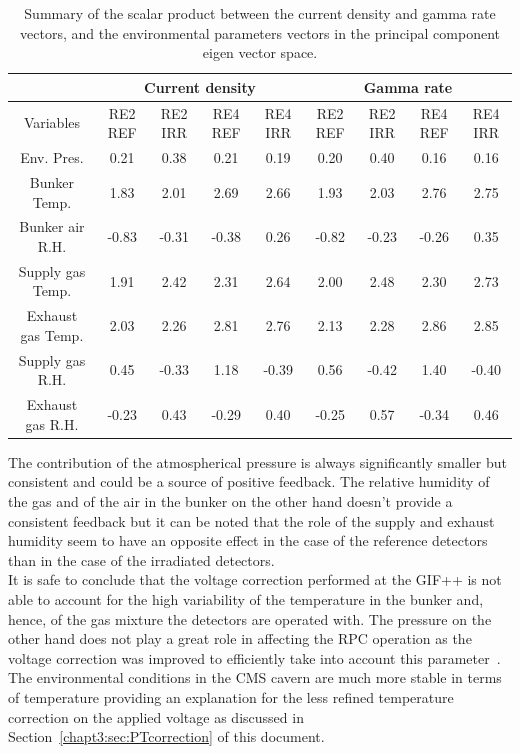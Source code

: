 	\begin{table}[H]
		\centering
		\scriptsize
		\begin{tabular}{|*{9}{c|}}
			\cline{2-9}
			\multicolumn{1}{c|}{} & \multicolumn{4}{c|}{Current density}  & \multicolumn{4}{c|}{Gamma rate}      \\
			\hline
			Variables             & RE2 REF & RE2 IRR & RE4 REF & RE4 IRR & RE2 REF & RE2 IRR & RE4 REF & RE4 IRR\\
			\hline
			Env. Pres.            &  0.21   &  0.38   &  0.21   &  0.19   &  0.20   &  0.40   &  0.16   &  0.16  \\
			\hline
			Bunker Temp.          &  1.83   &  2.01   &  2.69   &  2.66   &  1.93   &  2.03   &  2.76   &  2.75  \\
			\hline
			Bunker air R.H.       & -0.83   & -0.31   & -0.38   &  0.26   & -0.82   & -0.23   & -0.26   &  0.35  \\
			\hline
			Supply gas Temp.      &  1.91   &  2.42   &  2.31   &  2.64   &  2.00   &  2.48   &  2.30   &  2.73  \\
			\hline
			Exhaust gas Temp.     &  2.03   &  2.26   &  2.81   &  2.76   &  2.13   &  2.28   &  2.86   &  2.85  \\
			\hline
			Supply gas R.H.       &  0.45   & -0.33   &  1.18   & -0.39   &  0.56   & -0.42   &  1.40   & -0.40  \\
			\hline
			Exhaust gas R.H.      & -0.23   &  0.43   & -0.29   &  0.40   & -0.25   &  0.57   & -0.34   &  0.46  \\
			\hline
		\end{tabular}
		\caption{\label{tab:Scalar-FullData} Summary of the scalar product between the current density and gamma rate vectors, and the environmental parameters vectors in the principal component eigen vector space.}
	\end{table}

\normalsize
	
	The contribution of the atmospherical pressure is always significantly smaller but consistent and could be a source of positive feedback. The relative humidity of the gas and of the air in the bunker on the other hand doesn't provide a consistent feedback but it can be noted that the role of the supply and exhaust humidity seem to have an opposite effect in the case of the reference detectors than in the case of the irradiated detectors.\\
	It is safe to conclude that the voltage correction performed at the GIF++ is not able to account for the high variability of the temperature in the bunker and, hence, of the gas mixture the detectors are operated with. The pressure on the other hand does not play a great role in affecting the RPC operation as the voltage correction was improved to efficiently take into account this parameter~\cite{ABBRESCIA2013}. The environmental conditions in the CMS cavern are much more stable in terms of temperature providing an explanation for the less refined temperature correction on the applied voltage as discussed in Section~\ref{chapt3:sec:PTcorrection} of this document.
	
